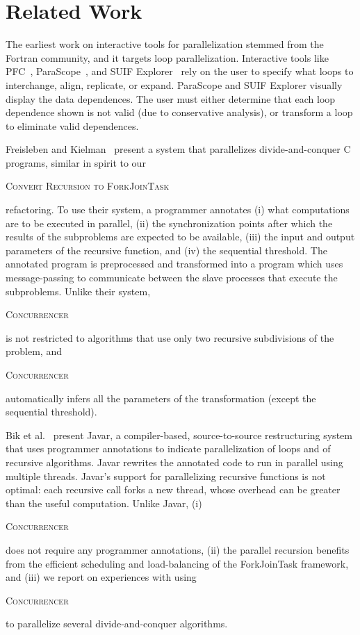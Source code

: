 \documentclass[10pt,twocolumn]{article}
\newcommand{\tool}{\begin{scriptsize}\textsc{Concurrencer}\end{scriptsize}\xspace}
\newcommand{\ConvertToForkJoinTask}{{\begin{smaller}\begin{smaller}\textsc{Convert Recursion to ForkJoinTask}\end{smaller}\end{smaller}}\xspace}
\begin{document}
\section{Related Work}

The earliest work on interactive tools for parallelization stemmed from the Fortran
community, and it targets loop parallelization. Interactive tools like
PFC~\cite{Allen'84:PFC}, ParaScope~\cite{Kennedy'91:ParaScope}, and SUIF
Explorer~\cite{Liao'99:SUIFExplorer} rely on the user to specify what loops to
interchange, align, replicate, or expand.
ParaScope and SUIF Explorer visually display the data dependences.  The user
must either determine that each loop dependence shown is not valid (due to
conservative analysis), or transform a loop to eliminate valid
dependences.


Freisleben and Kielman~\cite{Freisleben'95:automatedTransformation} present a
system that parallelizes divide-and-conquer C programs, similar in spirit to
our \ConvertToForkJoinTask refactoring. To use their system, a programmer annotates (i)
what computations are to be executed in parallel, (ii) the synchronization
points after which the results of the subproblems are expected to be available,
(iii) the input and output parameters of the recursive function, and (iv) the
sequential threshold. The annotated program is preprocessed and transformed
into a program which uses message-passing to communicate between the slave
processes that execute the subproblems. Unlike their system, \tool is not
restricted to algorithms that use only two recursive subdivisions of the
problem, and \tool automatically infers all the parameters of the
transformation (except the sequential threshold).

Bik et al.~\cite{Bik'97:loopParallelizationInJava} present Javar, a
compiler-based, source-to-source restructuring system that uses programmer
annotations to indicate parallelization of loops and of recursive algorithms. Javar
rewrites the annotated code to run in parallel using multiple threads. Javar's
support for parallelizing recursive functions is not optimal: each recursive
call forks a new thread, whose overhead can be greater than the useful
computation. Unlike Javar, (i) \tool does not require any programmer
annotations, (ii) the parallel recursion benefits from the efficient scheduling
and load-balancing of the ForkJoinTask framework, and (iii) we report on
experiences with using \tool to parallelize several divide-and-conquer algorithms.
\end{document}
